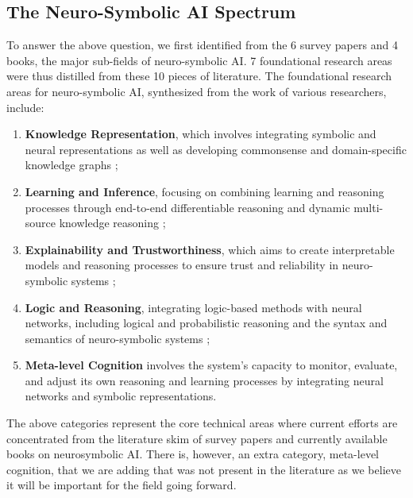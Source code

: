 \documentclass[journal]{IEEEtran}
\begin{document}
\subsection{The Neuro-Symbolic AI Spectrum}
To answer the above question, we first identified from the 6 survey papers and 4 books, the major sub-fields of neuro-symbolic AI. 7 foundational research areas were thus distilled from these 10 pieces of literature. The foundational research areas for neuro-symbolic AI, synthesized from the work of various researchers, include: 
\begin{enumerate}
    \item \textbf{Knowledge Representation}, which involves integrating symbolic and neural representations as well as developing commonsense and domain-specific knowledge graphs \cite{Gibaut2023, Hitzler2023, Shakarian2023};
    \item \textbf{Learning and Inference}, focusing on combining learning and reasoning processes through end-to-end differentiable reasoning and dynamic multi-source knowledge reasoning \cite{Yu2021, Wan2024, Dingli2023};
    \item \textbf{Explainability and Trustworthiness}, which aims to create interpretable models and reasoning processes to ensure trust and reliability in neuro-symbolic systems \cite{Marra2024, MichelDeletie2024};
    \item \textbf{Logic and Reasoning}, integrating logic-based methods with neural networks, including logical and probabilistic reasoning and the syntax and semantics of neuro-symbolic systems \cite{Marra2024, Shakarian2023};
    \item \textbf{Meta-level Cognition} involves the system's capacity to monitor, evaluate, and adjust its own reasoning and learning processes by integrating neural networks and symbolic representations.

\end{enumerate}

The above categories represent the core technical areas where current efforts are concentrated from the literature skim of survey papers and currently available books on neurosymbolic AI. There is, however, an extra category, meta-level cognition, that we are adding that was not present in the literature as we believe it will be important for the field going forward. 
\end{document}
